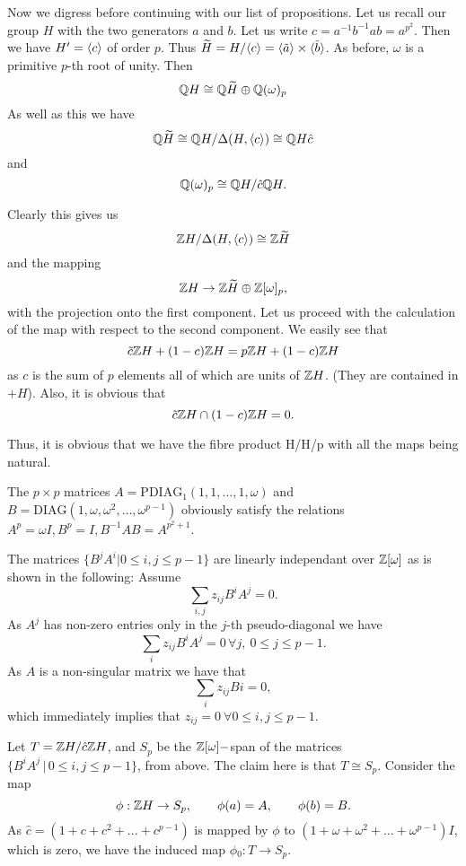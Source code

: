 \documentclass[11pt]{report}
\begin{document}
Now we digress before continuing with our list of propositions.  Let us recall our group $H$ with the
two generators $a$ and $b$. Let us write $c = a^{-1}b^{-1}ab = a^{p^{2}}$.
Then we have $H' = \langle c \rangle$ of order $p$. Thus $\widetilde{H} = 
H/\langle c \rangle=\langle \tilde{a} \rangle \times \langle \tilde{b} \rangle$. As before, $\omega$ is a primitive $p$-th 
root of unity.  Then \[ \mathbb{Q}{}H \cong{}  \mathbb{Q}{}\widetilde{H} \oplus 
 \mathbb{Q}{}(\omega)_p\] 
As well as this we have 
\[ \mathbb{Q}{}\widetilde{H} \cong{}  \mathbb{Q}{}H/\Delta(H,\langle c \rangle) \cong{} 
 \mathbb{Q}{}H\hat{c} \]and
\[ \mathbb{Q}(\omega)_{p} \cong{}  \mathbb{Q}{}H/\hat{c} \mathbb{Q}{}H.\]

Clearly this gives us
\[ \mathbb{Z}{}H / \Delta{}(H,\langle c \rangle) \cong{}  \mathbb{Z}{}\widetilde{H} \] and the mapping
\[ \mathbb{Z}{}H \rightarrow \mathbb{Z}\widetilde{H} \oplus  \mathbb{Z}[\omega{}]_{p} ,\]
with the projection onto the first component. Let us proceed with the calculation of the map with
respect to the second component. We easily see that
\[\tilde{c} \mathbb{Z}{}H +(1-c)  \mathbb{Z}{}H = p \mathbb{Z}{}H + (1 - c) \mathbb{Z}{}H\]
as $c$ is the sum of $p$ elements all of which are units of \( \mathbb{Z}{}H\). (They are contained in $+ H$). 
Also, it is obvious that
\[\tilde{c} \mathbb{Z}{}H \cap (1-c)  \mathbb{Z}{}H = 0 .\]

Thus, it is obvious that we have the fibre product
%
{\integers{}H/\integers{}H}{\integers{}/p\integers{}}
with all the maps being natural.


The $p\times p$ matrices \(A =  \mathrm{PDIAG}_1(1,1,\ldots{},1,\omega{})\) and
$ B = \mathrm{DIAG}(1,\omega{},\omega{}^2,\ldots,\omega{}^{p-1})$ obviously satisfy the
relations $A^p=\omega{}I, B^p = I, B^{-1}AB = A^{p^{2}+1}$.

The matrices $ \{B^jA^i \vert 0\leq{}i,j\leq{}p-1\}$ are linearly independant over 
$ \mathbb{Z}{}[\omega{}]$ as is shown in the following: Assume 
\[\sum_{i,j}z_{ij}B^iA^j = 0.\]
As $A^j$ has non-zero entries only  in the $j$-th pseudo-diagonal we have
\[\sum_{i}z_{ij}B^iA^j = 0\, \forall{} j,\ 0\leq{}j\leq{}p-1.\]
As $A$ is a non-singular matrix we have that
\[\sum_{i}z_{ij}B{i} = 0,\]
which immediately implies that $z_{ij} = 0\ \forall 0\leq{}i,j\leq{}p-1$.

Let $T= \mathbb{Z}{}H/\hat{c} \mathbb{Z}{}H$, and $S_p$ be the
$ \mathbb{Z}{}[\omega{}]-$span of the matrices $\{B^iA^j\, \vert\, 0\leq{}i,j\leq{}p-1\}$,
from above. The claim here is that $T \cong{} S_p$. Consider the map
\[
\phi{}:  \mathbb{Z}{}H \rightarrow{}S_p,\qquad \phi(a) = A,\qquad \phi(b) = B.\]
As $\hat{c} = (1+c+c^2+...+c^{p-1})$ is mapped by $\phi$ to 
$(1+\omega{}+\omega{}^2+...+\omega{}^{p-1})I$, which is zero, we have the induced map
$\phi{}_0: T \rightarrow{} S_p.$
\end{document}
